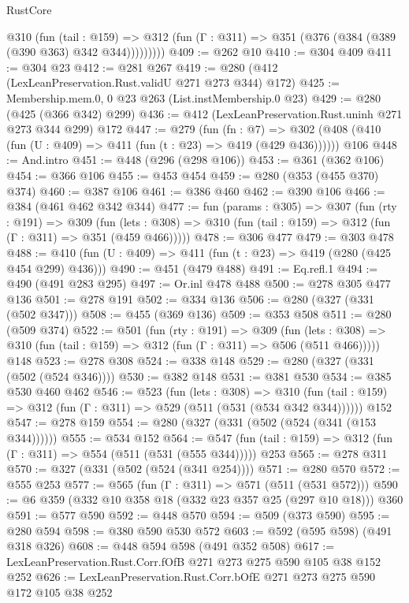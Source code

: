 \begin{lexlean}{RustCore}
\begin{coremodule}
          @310
            (fun (tail : @159) =>
            @312 (fun (Γ : @311) => @351 (@376 (@384 (@389 (@390 @363) @342 @344)))))))))
@409 := @262 @10
@410 := @304 @409
@411 := @304 @23
@412 := @281 @267
@419 := @280 (@412 (LexLeanPreservation.Rust.validU @271 @273 @344) @172)
@425 := Membership.mem.{0, 0} @23 @263 (List.instMembership.{0} @23)
@429 := @280 (@425 (@366 @342) @299)
@436 := @412 (LexLeanPreservation.Rust.uninh @271 @273 @344 @299) @172
@447 := @279
    (fun (fn : @7) =>
    @302 (@408 (@410 (fun (U : @409) => @411 (fun (t : @23) => @419 (@429 @436))))))
    @106
@448 := And.intro
@451 := @448 (@296 (@298 @106))
@453 := @361 (@362 @106)
@454 := @366 @106
@455 := @453 @454
@459 := @280 (@353 (@455 @370) @374)
@460 := @387 @106
@461 := @386 @460
@462 := @390 @106
@466 := @384 (@461 @462 @342 @344)
@477 := fun (params : @305) =>
  @307
    (fun (rty : @191) =>
    @309
      (fun (lets : @308) => @310 (fun (tail : @159) => @312 (fun (Γ : @311) => @351 (@459 @466)))))
@478 := @306 @477
@479 := @303 @478
@488 := @410 (fun (U : @409) => @411 (fun (t : @23) => @419 (@280 (@425 @454 @299) @436)))
@490 := @451 (@479 @488)
@491 := Eq.refl.{1}
@494 := @490 (@491 @283 @295)
@497 := Or.inl @478 @488
@500 := @278 @305 @477 @136
@501 := @278 @191
@502 := @334 @136
@506 := @280 (@327 (@331 (@502 @347)))
@508 := @455 (@369 @136)
@509 := @353 @508
@511 := @280 (@509 @374)
@522 := @501
    (fun (rty : @191) =>
    @309
      (fun (lets : @308) => @310 (fun (tail : @159) => @312 (fun (Γ : @311) => @506 (@511 @466)))))
    @148
@523 := @278 @308
@524 := @338 @148
@529 := @280 (@327 (@331 (@502 (@524 @346))))
@530 := @382 @148
@531 := @381 @530
@534 := @385 @530 @460 @462
@546 := @523
    (fun (lets : @308) =>
    @310 (fun (tail : @159) => @312 (fun (Γ : @311) => @529 (@511 (@531 (@534 @342 @344))))))
    @152
@547 := @278 @159
@554 := @280 (@327 (@331 (@502 (@524 (@341 (@153 @344))))))
@555 := @534 @152
@564 := @547 (fun (tail : @159) => @312 (fun (Γ : @311) => @554 (@511 (@531 (@555 @344))))) @253
@565 := @278 @311
@570 := @327 (@331 (@502 (@524 (@341 @254))))
@571 := @280 @570
@572 := @555 @253
@577 := @565 (fun (Γ : @311) => @571 (@511 (@531 @572)))
@590 := @6 @359 (@332 @10 @358 @18 (@332 @23 @357 @25 (@297 @10 @18))) @360
@591 := @577 @590
@592 := @448 @570
@594 := @509 (@373 @590)
@595 := @280 @594
@598 := @380 @590 @530 @572
@603 := @592 (@595 @598) (@491 @318 @326)
@608 := @448 @594 @598 (@491 @352 @508)
@617 := LexLeanPreservation.Rust.Corr.fOfB @271 @273 @275 @590 @105 @38 @152 @252
@626 := LexLeanPreservation.Rust.Corr.bOfE @271 @273 @275 @590 @172 @105 @38 @252

\end{coremodule}
\end{lexlean}
